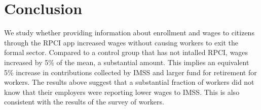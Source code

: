 \documentclass[oneside,11pt]{article}
\begin{document}



\section{Conclusion} \label{conclusion}

We study whether providing information about enrollment and wages to citizens through the RPCI app increased wages without causing workers to exit the formal sector. Compared to a control group that has not intalled RPCI, wages increased by 5\% of the mean, a substantial amount. This implies an equivalent 5\% increase in contributions collected by IMSS and larger fund for retirement for workers. The results above suggest that a substantial fraction of workers did not know that their employers were reporting lower wages to IMSS. This is also consistent with the results of the survey of workers. 
\end{document}
